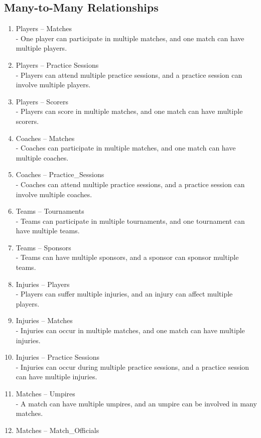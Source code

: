\documentclass[a4paper, 12pt]{article}
\begin{document}
\subsection{Many-to-Many Relationships}

\begin{enumerate}
\item Players – Matches \\
- One player can participate in multiple matches, and one match can have multiple players.
\item Players – Practice Sessions \\
- Players can attend multiple practice sessions, and a practice session can involve multiple players.
\item Players – Scorers \\
- Players can score in multiple matches, and one match can have multiple scorers.
\item Coaches – Matches \\
- Coaches can participate in multiple matches, and one match can have multiple coaches.
\item Coaches – Practice\_Sessions \\
- Coaches can attend multiple practice sessions, and a practice session can involve multiple coaches.
\item Teams – Tournaments \\
- Teams can participate in multiple tournaments, and one tournament can have multiple teams.
\item Teams – Sponsors \\
- Teams can have multiple sponsors, and a sponsor can sponsor multiple teams.
\item Injuries – Players \\
- Players can suffer multiple injuries, and an injury can affect multiple players.
\item Injuries – Matches \\
- Injuries can occur in multiple matches, and one match can have multiple injuries.
\item Injuries – Practice Sessions \\
- Injuries can occur during multiple practice sessions, and a practice session can have multiple injuries.
\item Matches – Umpires \\
- A match can have multiple umpires, and an umpire can be involved in many matches.
\item Matches – Match\_Officials \\

\end{enumerate}
\end{document}
